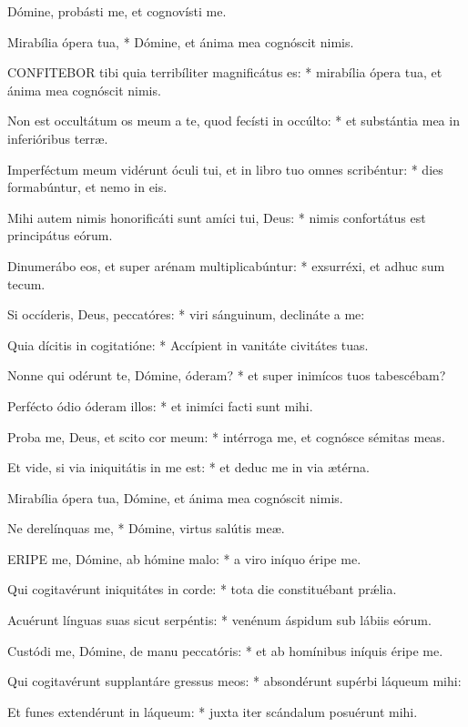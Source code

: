  Dómine, probásti me, et cognovísti me.

 Mirabília ópera tua, * Dómine, et ánima mea cognóscit nimis.


\lettrine[lines=2]{C}{ONFITEBOR} tibi quia terribíliter magnificátus es: * mirabília ópera tua, et ánima mea cognóscit nimis.

Non est occultátum os meum a te, quod fecísti in occúlto: * et substántia mea in inferióribus terræ.

Imperféctum meum vidérunt óculi tui, et in libro tuo omnes scribéntur: * dies formabúntur, et nemo in eis.

Mihi autem nimis honorificáti sunt amíci tui, Deus: * nimis confortátus est principátus eórum.

Dinumerábo eos, et super arénam multiplicabúntur: * exsurréxi, et adhuc sum tecum.

Si occíderis, Deus, peccatóres: * viri sánguinum, declináte a me:

Quia dícitis in cogitatióne: * Accípient in vanitáte civitátes tuas.

Nonne qui odérunt te, Dómine, óderam? * et super inimícos tuos tabescébam?

Perfécto ódio óderam illos: * et inimíci facti sunt mihi.

Proba me, Deus, et scito cor meum: * intérroga me, et cognósce sémitas meas.

Et vide, si via iniquitátis in me est: * et deduc me in via ætérna.

 Mirabília ópera tua, Dómine, et ánima mea cognóscit nimis.

 Ne derelínquas me, * Dómine, virtus salútis meæ.


\lettrine[lines=2]{E}{RIPE} me, Dómine, ab hómine malo: * a viro iníquo éripe me.

Qui cogitavérunt iniquitátes in corde: * tota die constituébant prǽlia.

Acuérunt línguas suas sicut serpéntis: * venénum áspidum sub lábiis eórum.

Custódi me, Dómine, de manu peccatóris: * et ab homínibus iníquis éripe me.

Qui cogitavérunt supplantáre gressus meos: * absondérunt supérbi láqueum mihi:

Et funes extendérunt in láqueum: * juxta iter scándalum posuérunt mihi.

